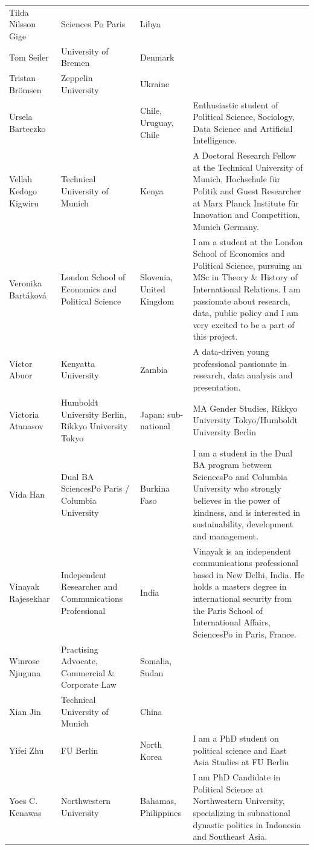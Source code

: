 \documentclass[]{article}
\begin{document}
\begin{longtable}{l>{\raggedright\arraybackslash}p{2cm}>{\raggedright\arraybackslash}p{2cm}>{\raggedright\arraybackslash}p{3cm}}
\addlinespace
\rowcolor{gray!6}  Tilda Nilsson Gige & Sciences Po Paris & Libya & \\
Tom Seiler & University of Bremen & Denmark & \\
\rowcolor{gray!6}  Tristan Brömsen & Zeppelin University & Ukraine & \\
Ursela Barteczko &  & Chile, Uruguay, Chile & Enthusiastic student of Political Science, Sociology, Data Science and Artificial Intelligence.\\
\rowcolor{gray!6}  Vellah Kedogo Kigwiru & Technical University of Munich & Kenya & A Doctoral Research Fellow at the Technical University of Munich, Hochschule für Politik and Guest Researcher at Marx Planck Institute für Innovation and Competition, Munich Germany.\\
\addlinespace
Veronika Bartáková & London School of Economics and Political Science & Slovenia, United Kingdom & I am a student at the London School of Economics and Political Science, pursuing an MSc in Theory \& History of International Relations. I am passionate about research, data, public policy and I am very excited to be a part of this project.\\
\rowcolor{gray!6}  Victor Abuor & Kenyatta University & Zambia & A data-driven young professional passionate in research, data analysis and presentation.\\
Victoria Atanasov & Humboldt University Berlin, Rikkyo University Tokyo & Japan: sub-national & MA Gender Studies, Rikkyo University Tokyo/Humboldt University Berlin\\
\rowcolor{gray!6}  Vida Han & Dual BA SciencesPo Paris / Columbia University & Burkina Faso & I am a student in the Dual BA program between SciencesPo and Columbia University who strongly believes in the power of kindness, and is interested in sustainability, development and management.\\
Vinayak Rajesekhar & Independent Researcher and Communications Professional & India & Vinayak is an independent communications professional based in New Delhi, India. He holds a masters degree in international security from the Paris School of International Affairs, SciencesPo in Paris, France.\\
\addlinespace
\rowcolor{gray!6}  Winrose Njuguna & Practising Advocate, Commercial \& Corporate Law & Somalia, Sudan & \\
Xian Jin & Technical University of Munich & China & \\
\rowcolor{gray!6}  Yifei Zhu & FU Berlin & North Korea & I am a PhD student on political science and East Asia Studies at FU Berlin\\
Yoes C. Kenawas & Northwestern University & Bahamas, Philippines & I am PhD Candidate in Political Science at Northwestern University, specializing in subnational dynastic politics in Indonesia and Southeast Asia.\\
\bottomrule
\end{longtable}
\end{document}
